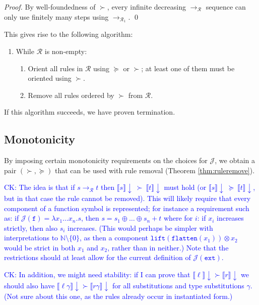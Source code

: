 \documentclass[runningheads,a4paper]{llncs}
\newcommand{\Rules}{\mathcal{R}}
\newcommand{\Termmap}{\mathcal{J}}
\newcommand{\interpret}[1]{\llbracket #1 \rrbracket}
\newcommand{\arr}[1]{\longrightarrow_{#1}}
\newcommand{\abs}[2]{\lambda #1.#2}
\newcommand{\flatten}{\mathtt{flatten}}
\newcommand{\lift}{\mathtt{lift}}
\newcommand{\CK}[1]{\textcolor{blue}{CK: #1}}
\begin{document}
\begin{proof}
By well-foundedness of $\succ$, every infinite decreasing $\arr{\Rules}$
sequence can only use finitely many steps using $\arr{\Rules_1}$.
\qed
\end{proof}

This gives rise to the following algorithm:
\begin{enumerate}
\item While $\Rules$ is non-empty:
  \begin{enumerate}
  \item Orient all rules in $\Rules$ using $\succeq$ or $\succ$; at least
    one of them must be oriented using $\succ$.
  \item Remove all rules ordered by $\succ$ from $\Rules$.
  \end{enumerate}
\end{enumerate}
If this algorithm succeeds, we have proven termination.

\subsection{Monotonicity}

By imposing certain monotonicity requirements on the choices for
$\Termmap$, we obtain a pair $(\succ,\succeq)$ that can be used with
rule removal (Theorem \ref{thm:ruleremove}).

\CK{%
The idea is that if $s \arr{\Rules} t$ then $\interpret{s}\downarrow\:
\succ\:\interpret{t}\downarrow$ must hold (or $\interpret{s}\downarrow\:
\succeq\:\interpret{t}\downarrow$, but in that case the rule cannot be
removed).  This will likely require that every component of a function
symbol is represented; for instance a requirement such as: if
$\Termmap(\mathtt{f}) = \abs{x_1 \dots x_n}{s}$, then $s = s_1 \oplus
\dots \oplus s_n + t$ where for $i$: if $x_i$ increases strictly,
then also $s_i$ increases.
(This would perhaps be simpler with interpretations to $\mathbb{N}
\setminus \{ 0 \}$, as then a component $\lift(\flatten(x_1)) \otimes
x_2$ would be strict in both $x_1$ and $x_2$, rather than in neither.)
Note that the restrictions should at least allow for the current
definition of $\Termmap(\mathtt{ext})$.}

\CK{In addition, we might need stability: if I can prove that
$\interpret{\ell} \downarrow \succ \interpret{r}\downarrow$ we should
also have $\interpret{\ell\gamma}\downarrow \succ
\interpret{r\gamma}\downarrow$ for all substitutions and type
substitutions $\gamma$.  (Not sure
about this one, as the rules already occur in instantiated form.)}
\end{document}
